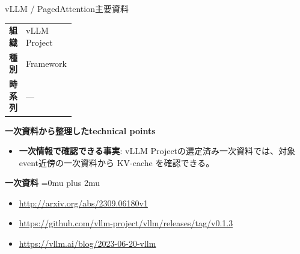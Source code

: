 \begin{technicalnote}{vLLM / PagedAttention}{主要資料}
\begingroup
\begin{tabularx}{\linewidth}{@{}>{\bfseries}p{0.22\linewidth}X@{}}
組織 & vLLM Project \\
種別 & Framework \\
時系列 & — \\
\end{tabularx}
\smallskip
{\bfseries 一次資料から整理したtechnical points}
\begin{itemize}[leftmargin=1.5em,itemsep=0.35em]
\item \textbf{一次情報で確認できる事実}: vLLM Projectの選定済み一次資料では、対象event近傍の一次資料から KV-cache を確認できる。
\end{itemize}
\begin{minipage}{\linewidth}
\begin{samepage}
{\bfseries 一次資料}
\begingroup\sloppy
\Urlmuskip=0mu plus 2mu\relax
\begin{itemize}[leftmargin=1.5em,itemsep=0.25em]
\item {\scriptsize\url{http://arxiv.org/abs/2309.06180v1}}
\item {\scriptsize\url{https://github.com/vllm-project/vllm/releases/tag/v0.1.3}}
\item {\scriptsize\url{https://vllm.ai/blog/2023-06-20-vllm}}
\end{itemize}
\endgroup
\end{samepage}
\end{minipage}
\endgroup
\end{technicalnote}
\medskip

